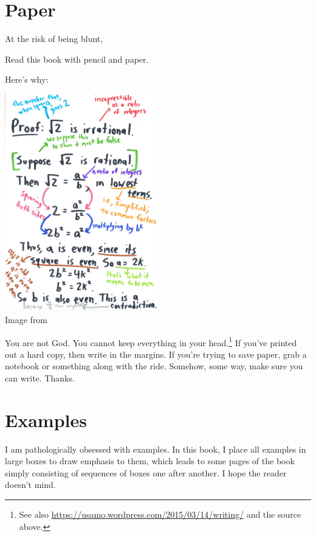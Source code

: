 
\section{Paper}
At the risk of being blunt,
\begin{moral}
Read this book with pencil and paper.
\end{moral}
Here's why:

\begin{center}
	\includegraphics[width=0.5\textwidth]{media/read-with-pencil.jpg}
	\\ \scriptsize Image from \cite{img:read_with_pencil}
\end{center}
You are not God.
You cannot keep everything in your head.\footnote{
	See also \url{https://usamo.wordpress.com/2015/03/14/writing/}
	and the source above.}
If you've printed out a hard copy, then write in the margins.
If you're trying to save paper,
grab a notebook or something along with the ride.
Somehow, some way, make sure you can write. Thanks.

\section{Examples}
I am pathologically obsessed with examples.
In this book, I place all examples in large boxes to draw emphasis to them,
which leads to some pages of the book simply consisting of sequences of boxes
one after another. I hope the reader doesn't mind.

